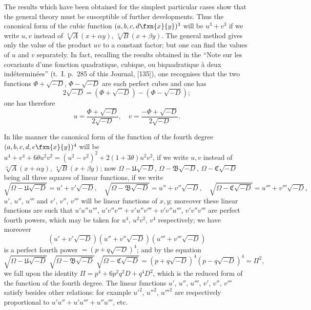\documentclass[11pt,a4paper]{book}
\begin{document}
The results which have been obtained for the simplest particular cases show that the general theory must be susceptible of further developments. Thus the canonical form of the cubic function $(a,b,c,d\,\!\fxn{x}{y})^3$ will be $u^3+v^3$ if we write $u,v$ instead of $\sqrt[3]{A}(x+\alpha y)$, $\sqrt[3]{B}(x+\beta y)$. The general method gives only the value of the product $uv$ to a constant factor; but one can find the values of $u$ and $v$ separately. In fact, recalling the results obtained in the ``Note sur les covariants d'une fonction quadratique, cubique, ou biquadratique à deux indéterminées'' (t.~I. p.~285 of this Journal, [135]), one recognises that the two functions $\Phi+\sqrt{-D}$, $\Phi-\sqrt{-D}$ are each perfect cubes and one has
\[
2\sqrt{-D} = (\Phi+\sqrt{-D}) - (\Phi-\sqrt{-D});
\]
one has therefore
\[
u = \frac{\Phi+\sqrt{-D}}{2\sqrt{-D}}, \quad v = \frac{-\Phi+\sqrt{-D}}{2\sqrt{-D}}.
\]

In like manner the canonical form of the function of the fourth degree $(a,b,c,d,e\,\!\fxn{x}{y})^4$ will be $u^4+v^4+6\theta u^2v^2 = (u^2-v^2)^2+2(1+3\theta)u^2v^2$, if we write $u,v$ instead of $\sqrt[4]{A}(x+\alpha y)$, $\sqrt[4]{B}(x+\beta y)$; now $\Omega-\mathfrak{U}\sqrt{-D}$, $\Omega-\mathfrak{B}\sqrt{-D}$, $\Omega-\mathfrak{C}\sqrt{-D}$ being all three squares of linear functions, if we write
\[
\sqrt{\Omega-\mathfrak{U}\sqrt{-D}} = u'+v'\sqrt{-D}, \quad
\sqrt{\Omega-\mathfrak{B}\sqrt{-D}} = u''+v''\sqrt{-D}, \quad
\sqrt{\Omega-\mathfrak{C}\sqrt{-D}} = u'''+v'''\sqrt{-D},
\]
$u'$, $u''$, $u'''$ and $v'$, $v''$, $v'''$ will be linear functions of $x,y$; moreover these linear functions are such that $u'u''u'''$, $u'v''v'''+v'u''v'''+v'v''u'''$, $v'v''v'''$ are perfect fourth powers, which may be taken for $u^4$, $u^2v^2$, $v^4$ respectively; we have moreover
\[
(u'+v'\sqrt{-D})(u''+v''\sqrt{-D})(u'''+v'''\sqrt{-D})
\]
is a perfect fourth power $= (p+q\sqrt{-D})^4$; and by the equation
\[
\sqrt{\Omega-\mathfrak{U}\sqrt{-D}} \; \sqrt{\Omega-\mathfrak{B}\sqrt{-D}} \; \sqrt{\Omega-\mathfrak{C}\sqrt{-D}}
= (p+q\sqrt{-D})^4(p-q\sqrt{-D})^4 = \Pi^2,
\]
we fall upon the identity $\Pi=p^4+6p^2q^2D+q^4D^2$, which is the reduced form of the function of the fourth degree. The linear functions $u'$, $u''$, $u'''$, $v'$, $v''$, $v'''$ satisfy besides other relations: for example $u'^2$, $u''^2$, $u'''^2$ are respectively proportional to $u'u''+u'u'''+u''u'''$, etc.
\end{document}
